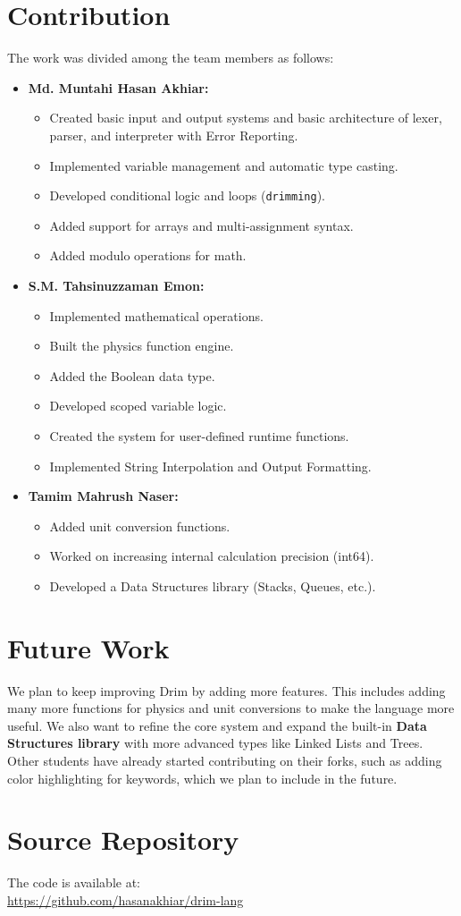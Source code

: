 \documentclass[12pt, a4paper]{article}
\begin{document}
\section{Contribution}
The work was divided among the team members as follows:
\begin{itemize}
    \item \textbf{Md. Muntahi Hasan Akhiar:}
    \begin{itemize}
        \item Created basic input and output systems and basic architecture of lexer, parser, and interpreter with Error Reporting.
        \item Implemented variable management and automatic type casting.
        \item Developed conditional logic and loops (\texttt{drimming}).
        \item Added support for arrays and multi-assignment syntax.
        \item Added modulo operations for math.
    \end{itemize}
    \item \textbf{S.M. Tahsinuzzaman Emon:}
    \begin{itemize}
        \item Implemented mathematical operations.
        \item Built the physics function engine.
        \item Added the Boolean data type.
        \item Developed scoped variable logic.
        \item Created the system for user-defined runtime functions.
        \item Implemented String Interpolation and Output Formatting.
    \end{itemize}
    \item \textbf{Tamim Mahrush Naser:}
    \begin{itemize}
        \item Added unit conversion functions.
        \item Worked on increasing internal calculation precision (int64).
        \item Developed a Data Structures library (Stacks, Queues, etc.).
    \end{itemize}
\end{itemize}

\vspace{1cm}

\section{Future Work}
We plan to keep improving Drim by adding more features. This includes adding many more functions for physics and unit conversions to make the language more useful. We also want to refine the core system and expand the built-in \textbf{Data Structures library} with more advanced types like Linked Lists and Trees. Other students have already started contributing on their forks, such as adding color highlighting for keywords, which we plan to include in the future.

\vspace{1cm}

\section{Source Repository}
The code is available at: \\
\url{https://github.com/hasanakhiar/drim-lang}
\end{document}
